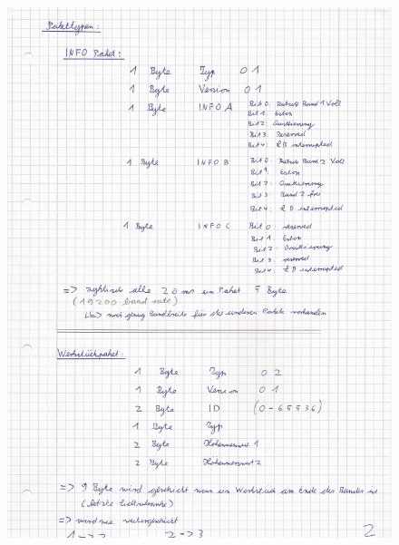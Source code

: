 \documentclass[a4paper, 11pt]{article}
\begin{document}
\begin{figure}[H]
\centering 
    \includegraphics[scale=0.8]{SI/si2.jpg}
    \label{si2}
\end{figure}

\newpage
\end{document}
